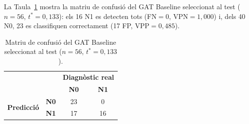 \documentclass[10pt,a4paper,twocolumn,twoside]{article}
\begin{document}
La Taula~\ref{tab:cm} mostra la matriu de confusió del GAT Baseline seleccionat al test
($n\!=\!56$, $t^*\!=\!0{,}133$): els 16 N1 es detecten tots (FN$=0$, VPN$=1{,}000$) i, dels
40 N0, 23 es classifiquen correctament (17 FP, VPP$=0{,}485$).

\begin{table}[H]
\centering
\caption{Matriu de confusió del GAT Baseline seleccionat al test ($n\!=\!56$, $t^*\!=\!0{,}133$).}
\label{tab:cm}
\small
\begin{tabular}{llcc}
\toprule
 & & \multicolumn{2}{c}{\textbf{Diagnòstic real}} \\
 & & \textbf{N0} & \textbf{N1} \\
\midrule
\multirow{2}{*}{\textbf{Predicció}}
  & \textbf{N0} & 23 & 0 \\
  & \textbf{N1} & 17 & 16 \\
\bottomrule
\end{tabular}
\end{table}
\end{document}

